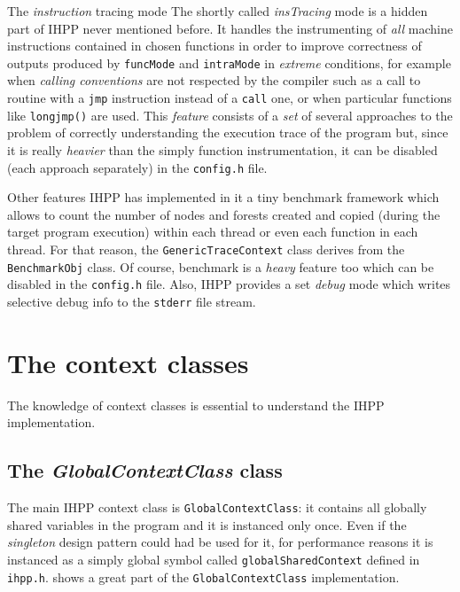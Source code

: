 \documentclass[a4paper,11pt]{report}
\begin{document}
\begin{paragraph}{The \emph{instruction} tracing mode}
The shortly called \emph{insTracing} mode is a hidden part of IHPP never
mentioned before. It handles the instrumenting of \emph{all} machine instructions
contained in chosen functions in order to improve correctness 
of outputs produced by \verb|funcMode| and \verb|intraMode| 
in \emph{extreme} conditions, for example when \emph{calling conventions} are not
respected by the compiler such as a call to routine with a \verb|jmp| instruction 
instead of a \verb|call| one, or when particular functions like \verb|longjmp()| are used.
This \emph{feature} consists of a \emph{set} of several approaches to the problem 
of correctly understanding the execution trace of the program but, 
since it is really \emph{heavier} than the simply function instrumentation,
it can be disabled (each approach separately) in the \verb|config.h| file.
\end{paragraph}

\begin{paragraph}{Other features}
IHPP has implemented in it a tiny benchmark framework which allows 
to count the number of nodes and forests created and copied (during the 
target program execution) within each
thread or even each function in each thread. For that reason,
the \verb|GenericTraceContext| class derives from the \verb|BenchmarkObj| class.
Of course, benchmark is a \emph{heavy} feature too which can be disabled 
in the \verb|config.h| file. Also, IHPP provides a set \emph{debug} mode
which writes selective debug info to the \verb|stderr| file stream.
\end{paragraph}

\section{The context classes}

The knowledge of context classes is essential to understand the IHPP implementation.

\subsection{The \emph{GlobalContextClass} class}
The main IHPP context class is \verb|GlobalContextClass|: it contains all globally shared variables in the program and it is instanced only once. 
Even if the \emph{singleton} design pattern could had be used for it, for 
performance reasons it is instanced as a simply global symbol called \verb|globalSharedContext| defined in \verb|ihpp.h|.
 shows a great part of the \verb|GlobalContextClass| implementation.
\end{document}

